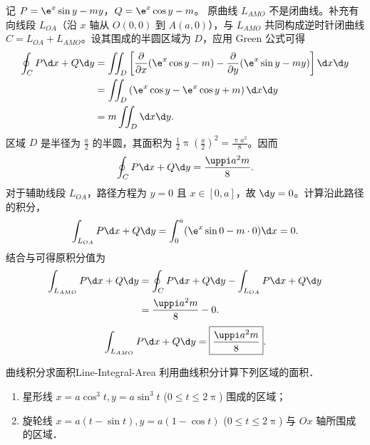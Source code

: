 \begin{solution}
    记 $P = \e^x \sin y - my$，$Q = \e^x \cos y - m$。
    原曲线 $L_{AMO}$ 不是闭曲线。补充有向线段 $L_{OA}$（沿 $x$ 轴从 $O(0,0)$ 到 $A(a,0)$），与 $L_{AMO}$ 共同构成逆时针闭曲线 $C = L_{OA} + L_{AMO}$。设其围成的半圆区域为 $D$，应用 Green 公式可得
    \begin{equation}
        \begin{aligned}
            \oint_C P \d x + Q \d y & = \iint_D \left[ \frac{\partial}{\partial x}(\e^x \cos y - m) - \frac{\partial}{\partial y}(\e^x \sin y - my) \right] \d x \d y \\
                                    & = \iint_D \left( \e^x \cos y - \e^x \cos y + m \right) \d x \d y                                                                \\
                                    & = m \iint_D \d x \d y.
        \end{aligned}
    \end{equation}
    区域 $D$ 是半径为 $\frac{a}{2}$ 的半圆，其面积为 $\frac{1}{2} \uppi \left(\frac{a}{2}\right)^2 = \frac{\uppi a^2}{8}$。因而
    \begin{equation}
        \label{eq:green-6-1}
        \oint_C P \d x + Q \d y = \frac{\uppi a^2 m}{8}.
    \end{equation}
    对于辅助线段 $L_{OA}$，路径方程为 $y=0$ 且 $x \in [0, a]$，故 $\d y = 0$。计算沿此路径的积分，
    \begin{equation}
        \label{eq:green-6-2}
        \int_{L_{OA}} P \d x + Q \d y = \int_0^a (\e^x \sin 0 - m \cdot 0) \d x = 0.
    \end{equation}
    结合与可得原积分值为
    \begin{equation}
        \begin{aligned}
            \int_{L_{AMO}} P \d x + Q \d y & = \oint_C P \d x + Q \d y - \int_{L_{OA}} P \d x + Q \d y \\
                                           & = \frac{\uppi a^2 m}{8} - 0.
        \end{aligned}
    \end{equation}
    \begin{equation}
        \int_{L_{AMO}} P \d x + Q \d y = \boxed{\frac{\uppi a^2 m}{8}}.
    \end{equation}
\end{solution}

\begin{problem}{曲线积分求面积}{Line-Integral-Area}
    利用曲线积分计算下列区域的面积．
    \begin{enumerate}
        \item 星形线 $x = a \cos^3 t, y = a \sin^3 t$ ($0 \le t \le 2\uppi$) 围成的区域；
        \item 旋轮线 $x = a(t - \sin t), y = a(1 - \cos t)$ ($0 \le t \le 2\uppi$) 与 $Ox$ 轴所围成的区域．
    \end{enumerate}
\end{problem}


